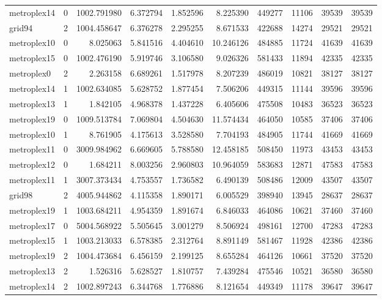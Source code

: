 \begin{longtable}{|l|r|r|r|r|r|r|r|r|r|}
metroplex14 & 0 & 1002.791980 & 6.372794 & 1.852596 & 8.225390 & 449277 & 11106 & 39539 & 39539 \\
grid94 & 2 & 1004.458647 & 6.376278 & 2.295255 & 8.671533 & 422688 & 14274 & 29521 & 29521 \\
metroplex10 & 0 & 8.025063 & 5.841516 & 4.404610 & 10.246126 & 484885 & 11724 & 41639 & 41639 \\
metroplex15 & 0 & 1002.476190 & 5.919746 & 3.106580 & 9.026326 & 581433 & 11894 & 42335 & 42335 \\
metroplex0 & 2 & 2.263158 & 6.689261 & 1.517978 & 8.207239 & 486019 & 10821 & 38127 & 38127 \\
metroplex14 & 1 & 1002.634085 & 5.628752 & 1.877454 & 7.506206 & 449315 & 11144 & 39596 & 39596 \\
metroplex13 & 1 & 1.842105 & 4.968378 & 1.437228 & 6.405606 & 475508 & 10483 & 36523 & 36523 \\
metroplex19 & 0 & 1009.513784 & 7.069804 & 4.504630 & 11.574434 & 464050 & 10585 & 37406 & 37406 \\
metroplex10 & 1 & 8.761905 & 4.175613 & 3.528580 & 7.704193 & 484905 & 11744 & 41669 & 41669 \\
metroplex11 & 0 & 3009.984962 & 6.669605 & 5.788580 & 12.458185 & 508450 & 11973 & 43453 & 43453 \\
metroplex12 & 0 & 1.684211 & 8.003256 & 2.960803 & 10.964059 & 583683 & 12871 & 47583 & 47583 \\
metroplex11 & 1 & 3007.373434 & 4.753557 & 1.736582 & 6.490139 & 508486 & 12009 & 43507 & 43507 \\
grid98 & 2 & 4005.944862 & 4.115358 & 1.890171 & 6.005529 & 398940 & 13945 & 28637 & 28637 \\
metroplex19 & 1 & 1003.684211 & 4.954359 & 1.891674 & 6.846033 & 464086 & 10621 & 37460 & 37460 \\
metroplex17 & 0 & 5004.568922 & 5.505645 & 3.001279 & 8.506924 & 498161 & 12700 & 47283 & 47283 \\
metroplex15 & 1 & 1003.213033 & 6.578385 & 2.312764 & 8.891149 & 581467 & 11928 & 42386 & 42386 \\
metroplex19 & 2 & 1004.473684 & 6.456159 & 2.199125 & 8.655284 & 464126 & 10661 & 37520 & 37520 \\
metroplex13 & 2 & 1.526316 & 5.628527 & 1.810757 & 7.439284 & 475546 & 10521 & 36580 & 36580 \\
metroplex14 & 2 & 1002.897243 & 6.344768 & 1.776886 & 8.121654 & 449349 & 11178 & 39647 & 39647 \\

\end{longtable}
